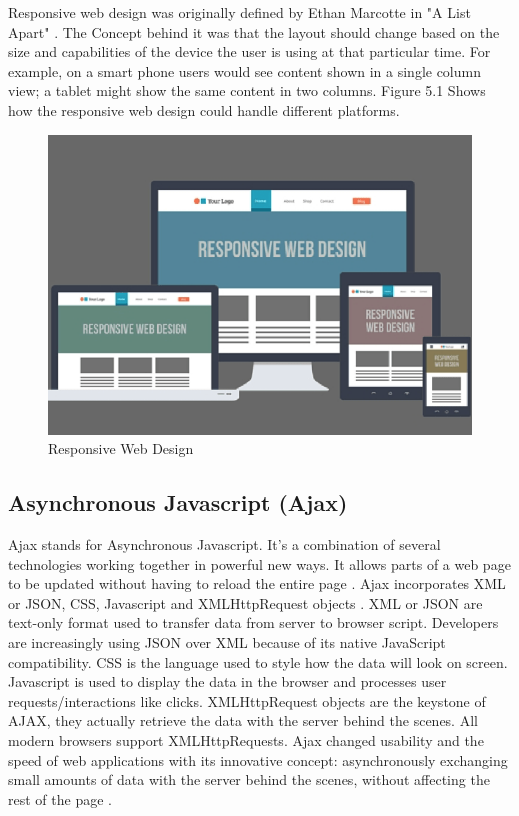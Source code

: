 Responsive web design was originally defined by Ethan Marcotte in "A List Apart" \cite{RWD2}. The Concept behind it was that the layout should change based on the size and capabilities of the device the user is using at that particular time. For example, on a smart phone users would see content shown in a single column view; a tablet might show the same content in two columns. Figure 5.1 Shows how the responsive web design could handle different platforms.
\begin{figure}[H]
\centering
\includegraphics[scale=0.5]{Images/RWD.png}
\caption[Responsive Web Design]{Responsive Web Design \cite{RWD3}}
\end{figure}
\subsection{Asynchronous Javascript (Ajax)}
Ajax stands for Asynchronous Javascript. It’s a combination of several technologies working together in powerful new ways. It allows parts of a web page to be updated without having to reload the entire page \cite{garrett2005ajax}. Ajax incorporates XML or JSON, CSS, Javascript and XMLHttpRequest objects \cite{AJAX}. XML or JSON are text-only format used to transfer data from server to browser script. Developers are increasingly using JSON over XML because of its native JavaScript compatibility. CSS is the language used to style how the data will look on screen. Javascript is used to display the data in the browser and processes user requests/interactions like clicks. XMLHttpRequest objects are the keystone of AJAX, they actually retrieve the data with the server behind the scenes. All modern browsers support XMLHttpRequests. Ajax changed usability and the speed of web applications with its innovative concept: asynchronously exchanging small amounts of data with the server behind the scenes, without affecting the rest of the page \cite{AJAX}.

